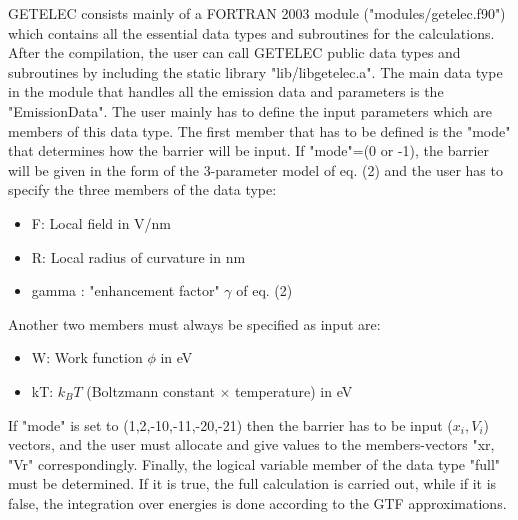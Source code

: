 \documentclass[notitlepage
]{revtex4-1}
\begin{document}
GETELEC consists mainly of a FORTRAN 2003 module ("modules/getelec.f90") which contains all the essential data types and subroutines for the calculations. After the compilation, the user can call GETELEC public data types and subroutines by including the static library "lib/libgetelec.a". The main data type in the module that handles all the emission data and parameters is the "EmissionData". The user mainly has to define the input parameters which are members of this data type. The first member that has to be defined is the "mode" that determines how the barrier will be input. If "mode"=(0 or -1), the barrier will be given in the form of the 3-parameter model of eq. (2) and the user has to specify the three members of the data type:
\begin{itemize}
	\item F: Local field in V/nm
	\item R: Local radius of curvature in nm
	\item gamma : "enhancement factor" $\gamma$ of eq. (2) 
\end{itemize} 
Another two members must always be specified as input are:
\begin{itemize}
	\item W: Work function $\phi$ in eV
	\item kT: $k_BT$ (Boltzmann constant $\times$ temperature) in eV
\end{itemize}
If "mode" is set to (1,2,-10,-11,-20,-21) then the barrier has to be input ($x_i,V_i$) vectors, and the user must allocate and give values to the members-vectors "xr, "Vr" correspondingly. Finally, the logical variable member of the data type  "full" must be determined. If it is true, the full calculation is carried out, while if it is false, the integration over energies is done according to the GTF approximations.
\end{document}
